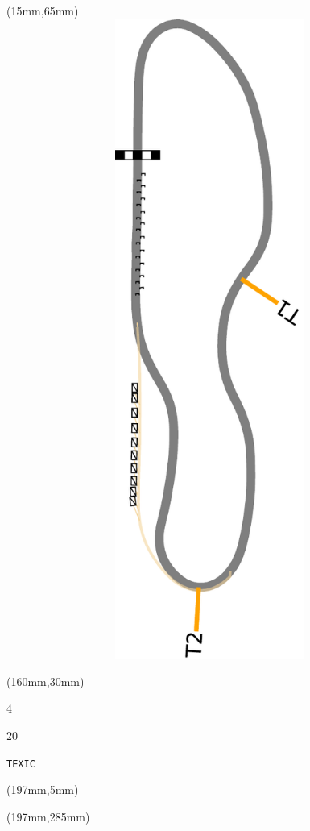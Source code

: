 \begin{textblock*}{185mm}(15mm,65mm)%
\centering
\mbox{\includegraphics[width=185mm,height=210mm,keepaspectratio]{PT/TEXIC.pdf}}
\end{textblock*}
\begin{textblock*}{40mm}(160mm,30mm)%
\Large
\par{} 
\par4 
\par20 
\par\hfill\tiny\tt TEXIC\\
\end{textblock*}
\begin{textblock*}{20mm}(197mm,5mm)%
\fbox{\thepage}
\label{TEXIC}
\end{textblock*}
\begin{textblock*}{20mm}(197mm,285mm)%
\fbox{\thepage}
\end{textblock*}

